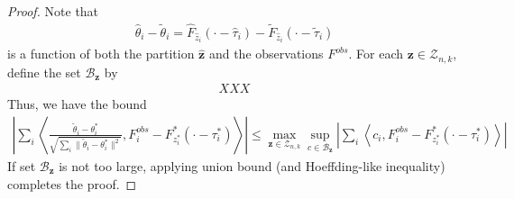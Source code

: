 \begin{proof}
Note that
\begin{align*}
\hat \theta_i - \tilde \theta_i 
= \hat F_{\hat z_i}(\cdot - \hat \tau_i) - \tilde F_{\hat z_i}(\cdot-\tilde\tau_i)
\end{align*}
is a function of both the partition $\mathbf{\hat z}$ and the observations $F^{obs}$.
For each $\mathbf{z}\in \mathcal Z_{n,k}$, define the set $\mathcal B_\mathbf{z}$ by
\begin{align*}
XXX
\end{align*}
Thus, we have the bound
\begin{align*}
 \left| \sum_i 
\left\langle 
\frac{\tilde \theta_i-\theta^*_i}{\sqrt{\sum_i \| \tilde \theta_i - \theta^*_i \|^2}} 
, F_i^{obs}-F^*_{z^*_i}(\cdot-\tau^*_i) \right\rangle   
\right| 
\leq 
\max_{\mathbf{z}\in \mathcal Z_{n,k}}
\sup_{c\in \mathcal B_{\mathbf{z}}}
\left | 
 \sum_{i} \left\langle c_i
 , F_i^{obs}-F^*_{z^*_i}(\cdot-\tau^*_i) \right\rangle   \right|
 \end{align*}
If set $\mathcal B_{\mathbf{z}}$ is not too large, applying union bound (and Hoeffding-like inequality) completes the proof.

\end{proof}


		
		
		
